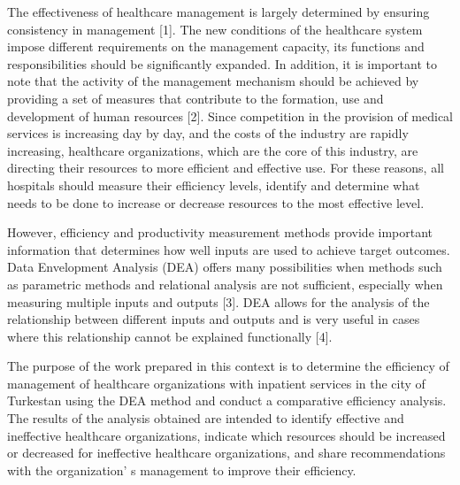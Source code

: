The effectiveness of healthcare management is largely determined by
ensuring consistency in management {[}1{]}. The new conditions of the
healthcare system impose different requirements on the management
capacity, its functions and responsibilities should be significantly
expanded. In addition, it is important to note that the activity of the
management mechanism should be achieved by providing a set of measures
that contribute to the formation, use and development of human resources
{[}2{]}. Since competition in the provision of medical services is
increasing day by day, and the costs of the industry are rapidly
increasing, healthcare organizations, which are the core of this
industry, are directing their resources to more efficient and effective
use. For these reasons, all hospitals should measure their efficiency
levels, identify and determine what needs to be done to increase or
decrease resources to the most effective level.

However, efficiency and productivity measurement methods provide
important information that determines how well inputs are used to
achieve target outcomes. Data Envelopment Analysis (DEA) offers many
possibilities when methods such as parametric methods and relational
analysis are not sufficient, especially when measuring multiple inputs
and outputs {[}3{]}. DEA allows for the analysis of the relationship
between different inputs and outputs and is very useful in cases where
this relationship cannot be explained functionally {[}4{]}.

The purpose of the work prepared in this context is to determine the
efficiency of management of healthcare organizations with inpatient
services in the city of Turkestan using the DEA method and conduct a
comparative efficiency analysis. The results of the analysis obtained
are intended to identify effective and ineffective healthcare
organizations, indicate which resources should be increased or decreased
for ineffective healthcare organizations, and share recommendations with
the organization' s management to improve their
efficiency.

